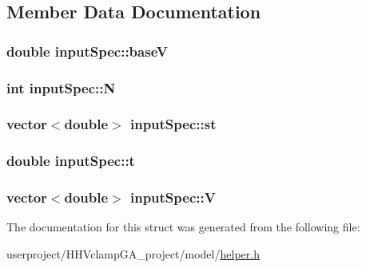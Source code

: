 \subsection{Member Data Documentation}
\hypertarget{structinputSpec_a6aeb08095e0d0094123108c8a74950a4}{
\subsubsection[{base\+V}]{\setlength{\rightskip}{0pt plus 5cm}double input\+Spec\+::base\+V}}\label{structinputSpec_a6aeb08095e0d0094123108c8a74950a4}
\hypertarget{structinputSpec_a25c637510c26633e00ac5f7704dce559}{
\subsubsection[{N}]{\setlength{\rightskip}{0pt plus 5cm}int input\+Spec\+::\+N}}\label{structinputSpec_a25c637510c26633e00ac5f7704dce559}
\hypertarget{structinputSpec_ad88c6e86de04404e7f066b417284414b}{
\subsubsection[{st}]{\setlength{\rightskip}{0pt plus 5cm}vector$<$double$>$ input\+Spec\+::st}}\label{structinputSpec_ad88c6e86de04404e7f066b417284414b}
\hypertarget{structinputSpec_aa82b84b9475da88190cec34e78478908}{
\subsubsection[{t}]{\setlength{\rightskip}{0pt plus 5cm}double input\+Spec\+::t}}\label{structinputSpec_aa82b84b9475da88190cec34e78478908}
\hypertarget{structinputSpec_a99484aaff897f3d87d4bbfea19f61766}{
\subsubsection[{V}]{\setlength{\rightskip}{0pt plus 5cm}vector$<$double$>$ input\+Spec\+::\+V}}\label{structinputSpec_a99484aaff897f3d87d4bbfea19f61766}


The documentation for this struct was generated from the following file\+:\begin{DoxyCompactItemize}
\item 
userproject/\+H\+H\+Vclamp\+G\+A\+\_\+project/model/\hyperlink{helper_8h}{helper.\+h}\end{DoxyCompactItemize}
